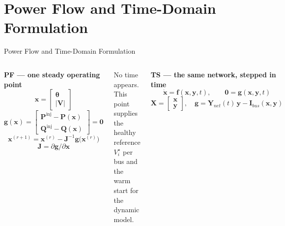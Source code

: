 \documentclass{beamer}
\begin{document}
\section{Power Flow and Time-Domain Formulation}
\begin{frame}{Power Flow and Time-Domain Formulation}
%
\begin{columns}[t,onlytextwidth]
\scriptsize
\textbf{PF --- one steady operating point}
\begin{equation}
\bm x=\begin{bmatrix}\bm\theta\\[1pt]|\bm V|\end{bmatrix}
\end{equation}
\vspace{-0.22cm}
\begin{equation}
\bm g(\bm x)=
\begin{bmatrix}
\bm P^{\mathrm{inj}}-\bm P(\bm x)\\[2pt]
\bm Q^{\mathrm{inj}}-\bm Q(\bm x)
\end{bmatrix}=\bm 0
\end{equation}
\vspace{-0.22cm}
\begin{equation}
\bm x^{(r+1)}=\bm x^{(r)}-\bm J^{-1}\bm g\bigl(\bm x^{(r)}\bigr)
\end{equation}
\vspace{-0.32cm}
\begin{equation}
\bm J=\partial\bm g/\partial\bm x
\end{equation}
\vspace{-0.20cm}

{\tiny No time appears. This point supplies the healthy reference $V_i^{\star}$
per bus and the warm start for the dynamic model.}

\scriptsize
\textbf{TS --- the same network, stepped in time}
\begin{equation}
\dot{\bm x}=\bm f(\bm x,\bm y,t),\qquad
\bm 0=\bm g(\bm x,\bm y,t)
\end{equation}
\vspace{-0.22cm}
\begin{equation}
\bm X=\begin{bmatrix}\bm x\\[1pt]\bm y\end{bmatrix},\quad
\bm g=\bm Y_{net}(t)\,\bm y-\bm I_{bus}(\bm x,\bm y)
\end{equation}
\vspace{-0.10cm}


\end{columns}
\end{frame}
\end{document}
